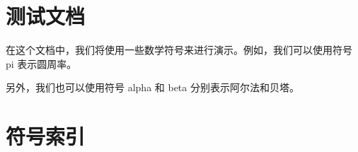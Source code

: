 \documentclass{article}
\begin{document}
\section{测试文档}

在这个文档中，我们将使用一些数学符号来进行演示。例如，我们可以使用符号 \gls{pi} 表示圆周率。

另外，我们也可以使用符号 \gls{alpha} 和 \gls{beta} 分别表示阿尔法和贝塔。

\section*{符号索引}
\printglossaries
\end{document}
